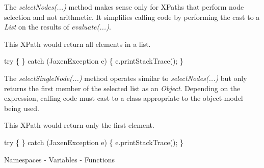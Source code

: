 \documentclass[20pt,landscape,headrule,footrule]{foils}
\begin{document}


The \emph{selectNodes(...)} method makes sense only for
XPaths that perform node selection and not arithmetic.  It simplifies
calling code by performing the cast to a \emph{List} on the results
of \emph{evaluate(...)}.

This XPath would return all  elements in a list.


\begin{codelisting}
try
\{
\}
catch (JaxenException e)
\{
    e.printStackTrace();
\}
\end{codelisting}



The \emph{selectSingleNode(...)} method operates similar to
\emph{selectNodes(...)} but only returns the first member
of the selected list as an \emph{Object}.  Depending on the
expression, calling code must cast to a class appropriate to
the object-model being used.

This XPath would return only the first  element.


\begin{codelisting}
try
\{
\}
catch (JaxenException e)
\{
    e.printStackTrace();
\}
\end{codelisting}



\begin{center}
Namespaces - Variables - Functions
\end{center}
\end{document}
